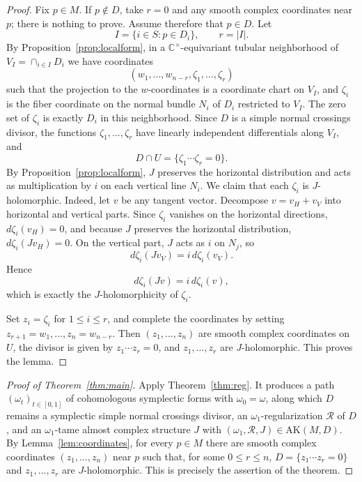 \documentclass[11pt]{article}
\begin{document}
\begin{proof}
Fix $p\in M$. If $p\notin D$, take $r=0$ and any smooth complex coordinates near $p$; there is nothing to prove. Assume therefore that $p\in D$. Let
\[
I=\{i\in S:p\in D_i\},\qquad r=|I|.
\]
By Proposition~\ref{prop:localform}, in a $\mathbb C^\times$-equivariant tubular neighborhood of $V_I=\cap_{i\in I}D_i$ we have coordinates
\[
(w_1,\dots,w_{n-r},\zeta_1,\dots,\zeta_r)
\]
such that the projection to the $w$-coordinates is a coordinate chart on $V_I$, and $\zeta_i$ is the fiber coordinate on the normal bundle $N_i$ of $D_i$ restricted to $V_I$. The zero set of $\zeta_i$ is exactly $D_i$ in this neighborhood. Since $D$ is a simple normal crossings divisor, the functions $\zeta_1,\dots,\zeta_r$ have linearly independent differentials along $V_I$, and
\[
D\cap U=\{\zeta_1\cdots\zeta_r=0\}.
\]
By Proposition~\ref{prop:localform}, $J$ preserves the horizontal distribution and acts as multiplication by $i$ on each vertical line $N_i$. We claim that each $\zeta_i$ is $J$-holomorphic. Indeed, let $v$ be any tangent vector. Decompose $v=v_H+v_V$ into horizontal and vertical parts. Since $\zeta_i$ vanishes on the horizontal directions, $d\zeta_i(v_H)=0$, and because $J$ preserves the horizontal distribution, $d\zeta_i(Jv_H)=0$. On the vertical part, $J$ acts as $i$ on $N_j$, so
\[
d\zeta_i(Jv_V)=i\,d\zeta_i(v_V).
\]
Hence
\[
d\zeta_i(Jv)=i\,d\zeta_i(v),
\]
which is exactly the $J$-holomorphicity of $\zeta_i$.

Set $z_i=\zeta_i$ for $1\le i\le r$, and complete the coordinates by setting $z_{r+1}=w_1,\dots,z_n=w_{n-r}$. Then $(z_1,\dots,z_n)$ are smooth complex coordinates on $U$, the divisor is given by $z_1\cdots z_r=0$, and $z_1,\dots,z_r$ are $J$-holomorphic. This proves the lemma.
\end{proof}

\begin{proof}[Proof of Theorem~\ref{thm:main}]
Apply Theorem~\ref{thm:reg}. It produces a path $(\omega_t)_{t\in[0,1]}$ of cohomologous symplectic forms with $\omega_0=\omega$, along which $D$ remains a symplectic simple normal crossings divisor, an $\omega_1$-regularization $\mathcal R$ of $D$, and an $\omega_1$-tame almost complex structure $J$ with $(\omega_1,\mathcal R,J)\in\mathrm{AK}(M,D)$. By Lemma~\ref{lem:coordinates}, for every $p\in M$ there are smooth complex coordinates $(z_1,\dots,z_n)$ near $p$ such that, for some $0\le r\le n$, $D=\{z_1\cdots z_r=0\}$ and $z_1,\dots,z_r$ are $J$-holomorphic. This is precisely the assertion of the theorem.
\end{proof}
\end{document}
